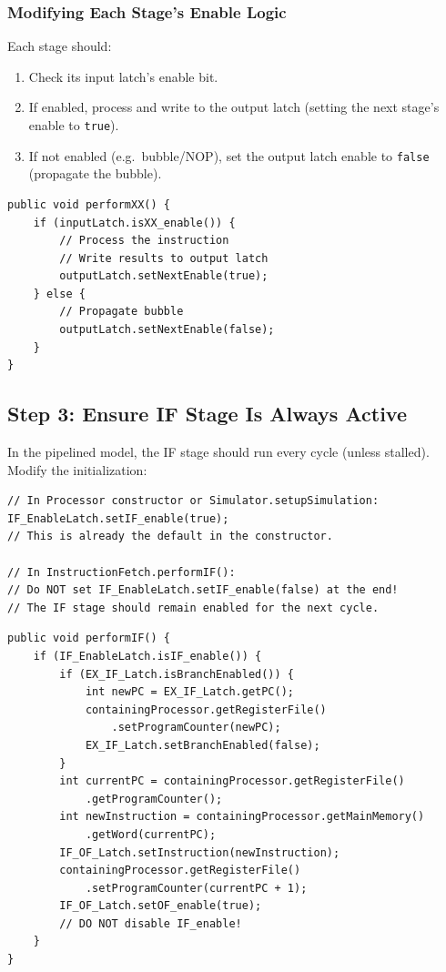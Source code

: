 \documentclass[12pt,a4paper]{article}
\begin{document}
\subsubsection{Modifying Each Stage's Enable Logic}
Each stage should:
\begin{enumerate}
    \item Check its input latch's enable bit.
    \item If enabled, process and write to the output latch (setting the next stage's enable to \texttt{true}).
    \item If not enabled (e.g.\ bubble/NOP), set the output latch enable to \texttt{false} (propagate the bubble).
\end{enumerate}

\begin{lstlisting}[style=javastyle, caption={General pattern for each pipeline stage}]
public void performXX() {
    if (inputLatch.isXX_enable()) {
        // Process the instruction
        // Write results to output latch
        outputLatch.setNextEnable(true);
    } else {
        // Propagate bubble
        outputLatch.setNextEnable(false);
    }
}
\end{lstlisting}

\subsection{Step 3: Ensure IF Stage Is Always Active}

In the pipelined model, the IF stage should run every cycle (unless stalled). Modify the initialization:

\begin{lstlisting}[style=javastyle, caption={IF stage always enabled}]
// In Processor constructor or Simulator.setupSimulation:
IF_EnableLatch.setIF_enable(true);
// This is already the default in the constructor.

// In InstructionFetch.performIF():
// Do NOT set IF_EnableLatch.setIF_enable(false) at the end!
// The IF stage should remain enabled for the next cycle.
\end{lstlisting}

\begin{lstlisting}[style=javastyle, caption={Modified IF stage for pipelining}]
public void performIF() {
    if (IF_EnableLatch.isIF_enable()) {
        if (EX_IF_Latch.isBranchEnabled()) {
            int newPC = EX_IF_Latch.getPC();
            containingProcessor.getRegisterFile()
                .setProgramCounter(newPC);
            EX_IF_Latch.setBranchEnabled(false);
        }
        int currentPC = containingProcessor.getRegisterFile()
            .getProgramCounter();
        int newInstruction = containingProcessor.getMainMemory()
            .getWord(currentPC);
        IF_OF_Latch.setInstruction(newInstruction);
        containingProcessor.getRegisterFile()
            .setProgramCounter(currentPC + 1);
        IF_OF_Latch.setOF_enable(true);
        // DO NOT disable IF_enable!
    }
}
\end{lstlisting}
\end{document}
